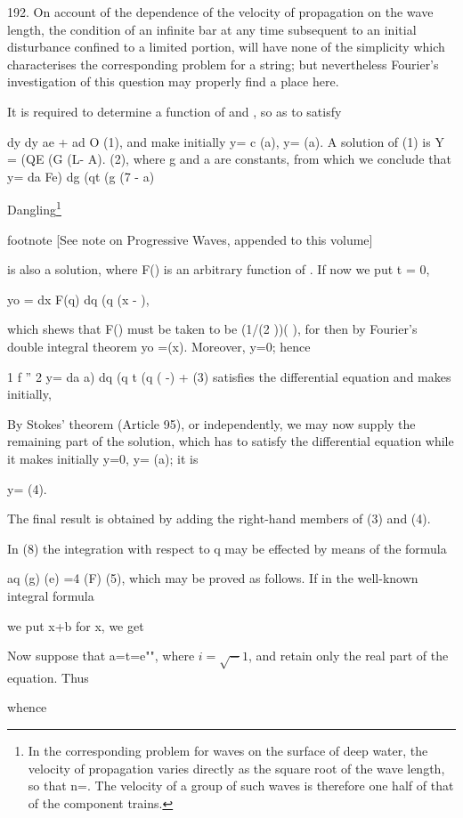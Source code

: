192. On account of the dependence of the velocity of propagation on the
wave length, the condition of an infinite bar at any time subsequent to
an initial disturbance confined to a limited portion, will have none of
the simplicity which characterises the corresponding problem for a
string; but nevertheless Fourier's investigation of this question may
properly find a place here.

It is required to determine a function of and , so as to satisfy

dy dy ae + ad O (1), and make initially y= c (a), y= (a). A solution of
(1) is Y = (QE (G (L- A). (2), where g and a are constants, from which
we conclude that
y= da Fe) dg (qt (g (7 - a)

Dangling\footnote{ In the corresponding problem for waves on the surface of deep water,
the velocity of propagation varies directly as the square root of the
wave length, so that n=. The velocity of a group of such waves is
therefore one half of that of the component trains.}

footnote [See note on Progressive Waves, appended to this volume]

is also a solution, where F() is an arbitrary function of . If now we
put t = 0,

yo = dx F(q) dq (q (x - ),

which shews that F() must be taken to be (1/(2 ))( ), for then by
Fourier's double integral theorem yo =(x). Moreover, y=0; hence

1 f '' 2 y= da a) dq (q t (q ( -) + (3) satisfies the
differential equation and makes initially,

By Stokes' theorem (Article 95), or independently, we may now supply the
remaining part of the solution, which has to satisfy the differential
equation while it makes initially y=0, y= (a); it is

y= (4).

The final result is obtained by adding the right-hand members of (3) and
(4).

In (8) the integration with respect to q may be effected by means of the
formula

aq (g) (e) =4 (F) (5),
which may be proved as follows. If in the well-known integral formula

we put x+b for x, we get

Now suppose that a=t=e"", where \(i=\sqrt -1\), and retain only the real
part of the equation. Thus

whence

